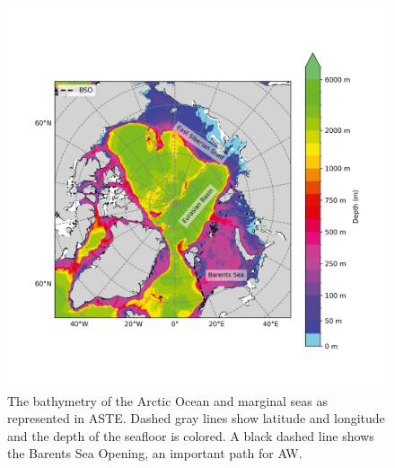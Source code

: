 \documentclass[a4paper,12pt]{article}
\begin{document}
    \begin{figure} %
    \centering
    \includegraphics[width=\linewidth]{../figures/ASTE_bathymetry_labels.png}
    \caption{The bathymetry of the Arctic Ocean and marginal seas as represented in ASTE. Dashed gray lines show latitude and longitude and the depth of the seafloor is colored. A black dashed line shows the Barents Sea Opening, an important path for AW.}
    \label{fig:bathymetry}
    \end{figure}
    
\end{document}
